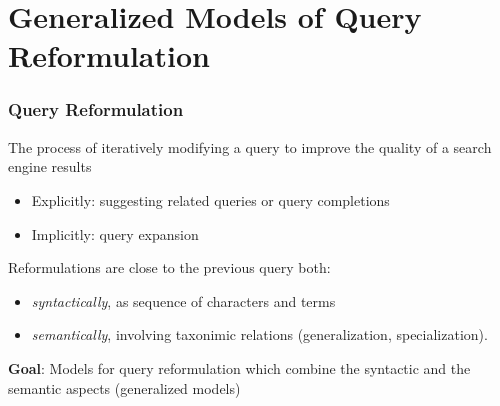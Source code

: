 \section{Generalized Models of Query Reformulation}

\begin{frame}
	\frametitle{Query Reformulation}
	\begin{block}
	 {The process of iteratively modifying a query to improve
the quality of a search engine results}
	\end{block}
	\begin{itemize}	
	 \item Explicitly: suggesting related queries or query completions
	 \item Implicitly: query expansion
	\end{itemize}
	\vskip5pt
	Reformulations are close to the previous query both:
	\begin{itemize}
	 \item \textit{syntactically}, as sequence of characters and terms
	 \item \textit{semantically}, involving taxonimic relations (generalization, specialization).
	\end{itemize}
	\textbf{Goal}: Models for query reformulation which combine the syntactic and
the semantic aspects (generalized models)

\end{frame}

